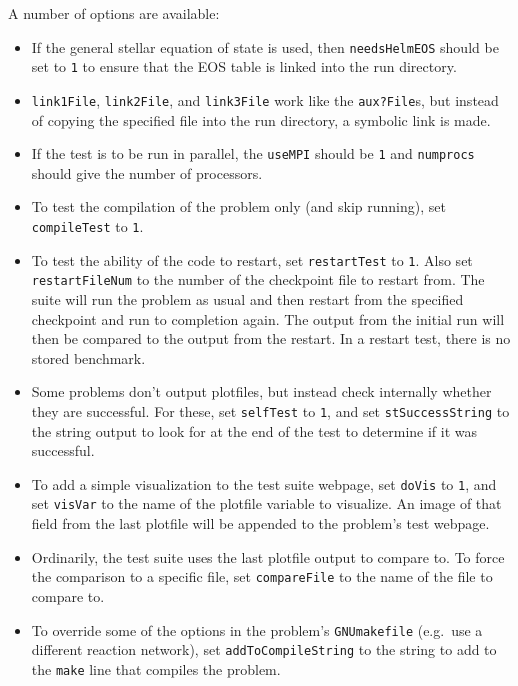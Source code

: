 A number of options are available:
\begin{itemize}
\item  If the general stellar equation of state is
used, then {\tt needsHelmEOS} should be set to {\tt 1} to ensure that the
EOS table is linked into the run directory.  

\item {\tt link1File}, {\tt link2File}, and {\tt link3File} work like
the {\tt aux?File}s, but instead of copying the specified file into
the run directory, a symbolic link is made.

\item If the test is to be run in parallel,
the {\tt useMPI} should be {\tt 1} and {\tt numprocs} should give the number
of processors.  

\item To test the compilation of the problem only (and skip running),
set {\tt compileTest} to {\tt 1}.  

\item To test the ability of the code to restart, set {\tt restartTest} to
{\tt 1}.  Also set {\tt restartFileNum} to the number of the checkpoint file to restart
from.  The suite will run the problem as usual and then restart from the specified
checkpoint and run to completion again.  The output from the initial run will
then be compared to the output from the restart.  In a restart test, there
is no stored benchmark.

\item Some problems don't output plotfiles, but instead check internally
whether they are successful.  For these, set {\tt selfTest} to {\tt 1},
and set {\tt stSuccessString} to the string output to look for at the
end of the test to determine if it was successful.


\item To add a simple visualization to the test suite webpage, set
  {\tt doVis} to {\tt 1}, and set {\tt visVar} to the name of the
  plotfile variable to visualize.  An image of that field from the
  last plotfile will be appended to the problem's test webpage.


\item Ordinarily, the test suite uses the last plotfile output to compare to.
To force the comparison to a specific file, set {\tt compareFile} to the 
name of the file to compare to.

\item To override some of the options in the problem's {\tt GNUmakefile}
(e.g.\ use a different reaction network), set {\tt addToCompileString}
to the  string to add to the {\tt make} line that compiles the problem.

\end{itemize}



